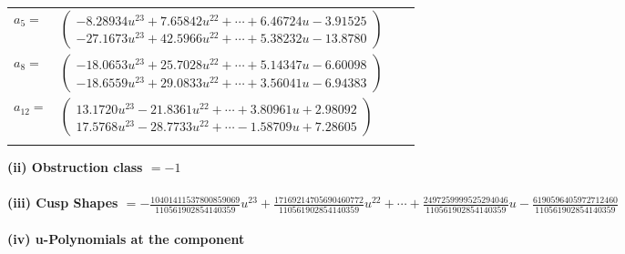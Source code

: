 \documentclass[1p]{elsarticle_modified}
\theoremstyle{definition}
\begin{document}
\begin{tabular}{m{7pt} m{180pt} m{7pt} m{180pt} }
\flushright $a_{5}=$&$\begin{pmatrix}-8.28934 u^{23}+7.65842 u^{22}+\cdots+6.46724 u-3.91525\\-27.1673 u^{23}+42.5966 u^{22}+\cdots+5.38232 u-13.8780\end{pmatrix}$ \\
\flushright $a_{8}=$&$\begin{pmatrix}-18.0653 u^{23}+25.7028 u^{22}+\cdots+5.14347 u-6.60098\\-18.6559 u^{23}+29.0833 u^{22}+\cdots+3.56041 u-6.94383\end{pmatrix}$ \\
\flushright $a_{12}=$&$\begin{pmatrix}13.1720 u^{23}-21.8361 u^{22}+\cdots+3.80961 u+2.98092\\17.5768 u^{23}-28.7733 u^{22}+\cdots-1.58709 u+7.28605\end{pmatrix}$\\&\end{tabular}
\flushleft \textbf{(ii) Obstruction class $= -1$}\\~\\
\flushleft \textbf{(iii) Cusp Shapes $= -\frac{10401411537800859069}{110561902854140359} u^{23}+\frac{17169214705690460772}{110561902854140359} u^{22}+\cdots+\frac{2497259999525294046}{110561902854140359} u-\frac{6190596405972712460}{110561902854140359}$}\\~\\
\newpage\renewcommand{\arraystretch}{1}
\flushleft \textbf{(iv) u-Polynomials at the component}\newline \\
\end{document}
